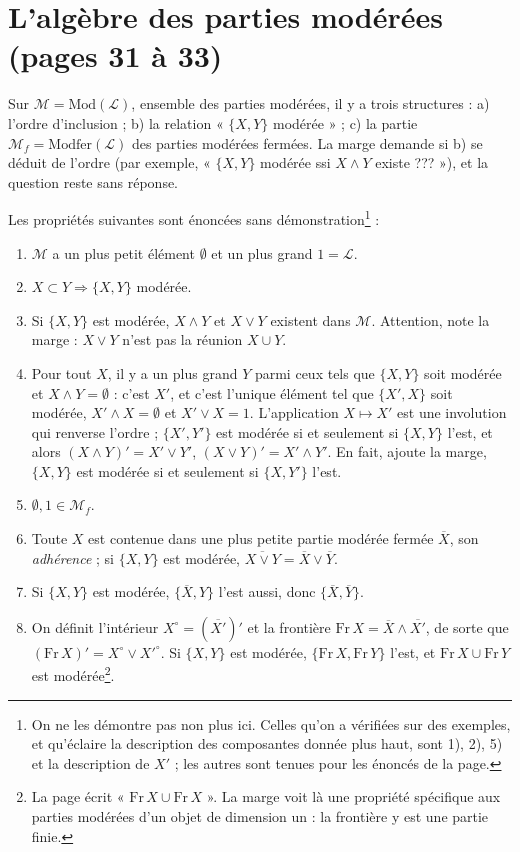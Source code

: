 \documentclass[11pt,a4paper]{article}
\begin{document}
\section*{L'algèbre des parties modérées (pages 31 à 33)}

Sur $\mathcal{M} = \mathrm{Mod}(\mathcal{L})$, ensemble des parties modérées, il
y a trois structures : a) l'ordre d'inclusion ; b) la relation « $\{X, Y\}$
modérée » ; c) la partie $\mathcal{M}_{f} = \mathrm{Modfer}(\mathcal{L})$ des
parties modérées fermées. La marge demande si b) se déduit de l'ordre (par
exemple, « $\{X,Y\}$ modérée ssi $X \wedge Y$ existe ??? »), et la question
reste sans réponse.

Les propriétés suivantes sont énoncées sans démonstration\footnote{On ne les
démontre pas non plus ici. Celles qu'on a vérifiées sur des exemples, et
qu'éclaire la description des composantes donnée plus haut, sont 1), 2), 5) et
la description de $X'$ ; les autres sont tenues pour les énoncés de la page.} :

\begin{enumerate}
\item[1)] $\mathcal{M}$ a un plus petit élément $\emptyset$ et un plus grand
$1 = \mathcal{L}$.
\item[2)] $X \subset Y \Rightarrow \{X, Y\}$ modérée.
\item[3)] Si $\{X,Y\}$ est modérée, $X \wedge Y$ et $X \vee Y$ existent dans
$\mathcal{M}$. Attention, note la marge : $X \vee Y$ n'est pas la réunion $X
\cup Y$.
\item[4)] Pour tout $X$, il y a un plus grand $Y$ parmi ceux tels que $\{X,Y\}$
soit modérée et $X \wedge Y = \emptyset$ : c'est $X'$, et c'est l'unique
élément tel que $\{X', X\}$ soit modérée, $X' \wedge X = \emptyset$ et $X' \vee
X = 1$. L'application $X \mapsto X'$ est une involution qui renverse l'ordre ;
$\{X',Y'\}$ est modérée si et seulement si $\{X,Y\}$ l'est, et alors $(X \wedge
Y)' = X' \vee Y'$, $(X \vee Y)' = X' \wedge Y'$. En fait, ajoute la marge,
$\{X,Y\}$ est modérée si et seulement si $\{X,Y'\}$ l'est.
\item[5)] $\emptyset, 1 \in \mathcal{M}_{f}$.
\item[6)] Toute $X$ est contenue dans une plus petite partie modérée fermée
$\overline{X}$, son \emph{adhérence} ; si $\{X,Y\}$ est modérée,
$\overline{X \vee Y} = \overline{X} \vee \overline{Y}$.
\item[7)] Si $\{X,Y\}$ est modérée, $\{\overline{X}, Y\}$ l'est aussi, donc
$\{\overline{X}, \overline{Y}\}$.
\item[8)] On définit l'intérieur $X^{\circ} = (\overline{X'})'$ et la frontière
$\mathrm{Fr}\, X = \overline{X} \wedge \overline{X'}$, de sorte que
$(\mathrm{Fr}\, X)' = X^{\circ} \vee X'^{\circ}$. Si $\{X,Y\}$ est modérée,
$\{\mathrm{Fr}\, X, \mathrm{Fr}\, Y\}$ l'est, et $\mathrm{Fr}\, X \cup
\mathrm{Fr}\, Y$ est modérée\footnote{La page écrit « $\mathrm{Fr}\, X \cup
\mathrm{Fr}\, X$ ». La marge voit là une propriété spécifique aux parties
modérées d'un objet de dimension un : la frontière y est une partie finie.}.
\end{enumerate}
\end{document}
